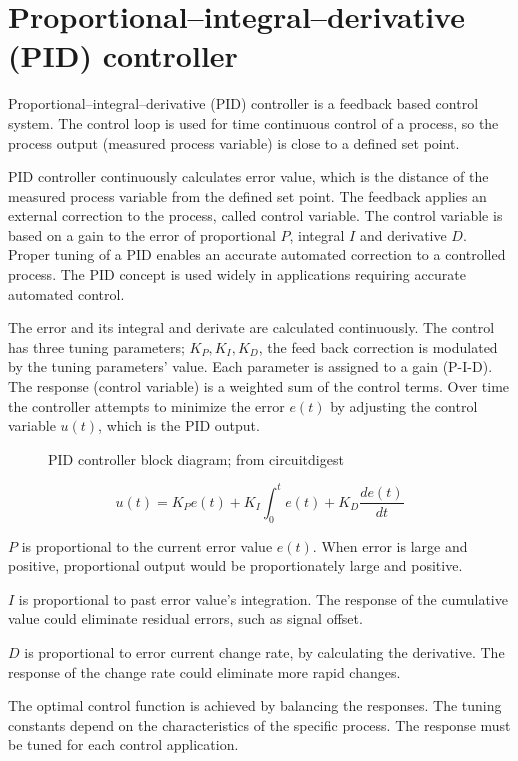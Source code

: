 \documentclass[\main/master.tex]{subfiles}
\begin{document}
\section{Proportional–integral–derivative (PID) controller}
Proportional–integral–derivative (PID) controller is a feedback based control system. The control loop is used for time continuous control of a process, so the process output (measured process variable) is close to a defined set point.
\par\noindent
PID controller continuously calculates error value, which is the distance of the measured process variable from the defined set point. The feedback applies an external correction to the process, called control variable. The control variable is based on a gain to the error of proportional $P$, integral $I$ and derivative $D$. Proper tuning of a PID enables an accurate automated correction to a controlled process. The PID concept is used widely in applications requiring accurate automated control.

\par\noindent
The error and its integral and derivate are calculated continuously. The control has three tuning parameters; $K_P, K_I, K_D$, the feed back correction is modulated by the tuning parameters' value. Each parameter is assigned to a gain (P-I-D). The response (control variable) is a weighted sum of the control terms. Over time the controller attempts to minimize the error $e(t)$ by adjusting the control variable $u(t)$, which is the PID output.
\par\noindent
\begin{figure}[htbp]
	\centering
	\caption[PID controller block diagram]{PID controller block diagram; from circuitdigest \cite{PID-diagram}}
	\label{fig:PID_scheme}
\end{figure}
\begin{equation}
u(t) = K_P e(t)+K_I\int_{0}^{t}e(t)+K_D\frac{de(t)}{dt}   \label{eqn:PID_eqn}
\end{equation}

\noindent
$P$ is proportional to the current error value $e(t)$. When error is large and positive, proportional output would be proportionately large and positive.
\par\noindent
$I$ is proportional to past error value's integration. The response of the cumulative value could eliminate residual errors, such as signal offset.
\par\noindent
$D$ is proportional to error current change rate, by calculating the derivative. The response of the change rate could eliminate more rapid changes.
\par\noindent
The optimal control function is achieved by balancing the responses. The tuning constants depend on the characteristics of the specific process. The response must be tuned for each control application.  
\end{document}
